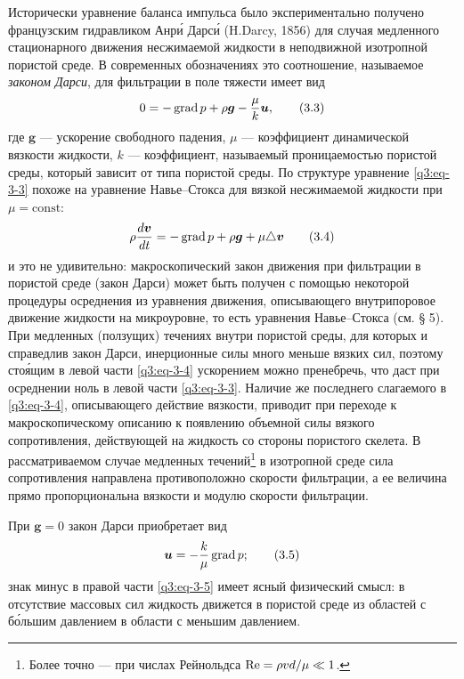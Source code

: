 Исторически уравнение баланса импульса было экспериментально получено французским гидравликом Анр\'и Дарс\'и (H.Darcy, 1856) для случая медленного стационарного движения несжимаемой жидкости в неподвижной изотропной пористой
среде. В современных обозначениях это соотношение, называемое \textit{законом Дарси}, для фильтрации в поле тяжести имеет вид
\begin{equation}
0=-\operatorname{grad} p+\rho\boldsymbol{g}-\frac{\mu}{k}\boldsymbol{u},
\tag{3.3}\label{q3:eq-3-3}
\end{equation}
где $\boldsymbol{g}$ --- ускорение свободного падения, $\mu$ --- коэффициент динамической вязкости жидкости, $k$ --- коэффициент, называемый проницаемостью пористой среды, который зависит от типа пористой среды. По структуре уравнение \eqref{q3:eq-3-3} похоже на уравнение Навье--Стокса для вязкой несжимаемой жидкости при $\mu=\mathrm{const}$:
\begin{equation}
\rho\frac{d\boldsymbol{v}}{dt}=-\operatorname{grad} p+\rho\boldsymbol{g}+\mu\triangle\boldsymbol{v}
\tag{3.4}\label{q3:eq-3-4}
\end{equation}
и это не удивительно: макроскопический закон движения при фильтрации в пористой среде (закон Дарси) может быть получен с помощью некоторой процедуры осреднения из уравнения движения, описывающего внутрипоровое движение жидкости на микроуровне, то есть уравнения Навье--Стокса (см. § 5). При медленных (ползущих) течениях внутри пористой среды, для которых и справедлив закон Дарси, инерционные силы много меньше вязких сил, поэтому сто\'ящим в левой части \eqref{q3:eq-3-4} ускорением можно пренебречь, что даст при осреднении ноль в левой части \eqref{q3:eq-3-3}. Наличие же последнего слагаемого в \eqref{q3:eq-3-4}, описывающего действие вязкости, приводит при переходе к макроскопическому описанию к появлению объемной силы вязкого сопротивления, действующей на жидкость со стороны пористого скелета. В рассматриваемом случае медленных течений\setcounter{footnote}{0}\footnote{Более точно --- при числах Рейнольдса $\mathrm{Re}=\rho vd/\mu\ll1$.} в изотропной среде сила сопротивления направлена противоположно скорости фильтрации, а ее величина прямо пропорциональна вязкости и модулю скорости фильтрации.

При $\boldsymbol{g}=0$ закон Дарси приобретает вид
\begin{equation}
\boldsymbol{u}=-\frac{k}{\mu}\operatorname{grad} p;
\tag{3.5}\label{q3:eq-3-5}
\end{equation}
знак минус в правой части \eqref{q3:eq-3-5} имеет ясный физический смысл: в отсутствие массовых сил жидкость движется в пористой среде из областей с б\'ольшим давлением в области с меньшим давлением.

